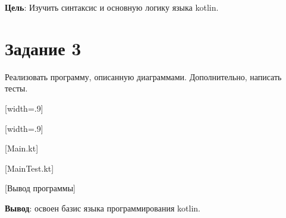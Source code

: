 \documentclass{bsuir}
\begin{document}
\maketitle
\mainmatter
\renewcommand{\thefigure}{\arabic{figure}}
\renewcommand{\thelisting}{\arabic{listing}}

\textbf{Цель}: Изучить синтаксис и основную логику языка kotlin.

\section*{Задание 3}

Реализовать программу, описанную диаграммами. Дополнительно, написать тесты.

[width=.9\textwidth]

[width=.9\textwidth]

[Main.kt]

[MainTest.kt]

[Вывод программы]

\textbf{Вывод}: освоен базис языка программирования kotlin.
\end{document}
